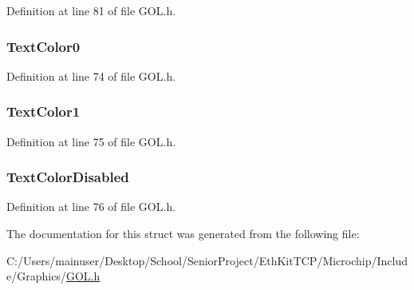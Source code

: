 Definition at line 81 of file G\+O\+L.\+h.

\hypertarget{struct_g_o_l___s_c_h_e_m_e_acde1a2115c6c5d7cc68407b25079f6fa}{}
\subsubsection[{Text\+Color0}]{ Text\+Color0}\label{struct_g_o_l___s_c_h_e_m_e_acde1a2115c6c5d7cc68407b25079f6fa}


Definition at line 74 of file G\+O\+L.\+h.

\hypertarget{struct_g_o_l___s_c_h_e_m_e_ae5c9f2f71dbabd17bf23d5a34b9b27af}{}
\subsubsection[{Text\+Color1}]{ Text\+Color1}\label{struct_g_o_l___s_c_h_e_m_e_ae5c9f2f71dbabd17bf23d5a34b9b27af}


Definition at line 75 of file G\+O\+L.\+h.

\hypertarget{struct_g_o_l___s_c_h_e_m_e_a9f472bff4931c01efcd847238096e751}{}
\subsubsection[{Text\+Color\+Disabled}]{ Text\+Color\+Disabled}\label{struct_g_o_l___s_c_h_e_m_e_a9f472bff4931c01efcd847238096e751}


Definition at line 76 of file G\+O\+L.\+h.



The documentation for this struct was generated from the following file\+:\begin{DoxyCompactItemize}
\item 
C\+:/\+Users/mainuser/\+Desktop/\+School/\+Senior\+Project/\+Eth\+Kit\+T\+C\+P/\+Microchip/\+Include/\+Graphics/\hyperlink{_g_o_l_8h}{G\+O\+L.\+h}\end{DoxyCompactItemize}
